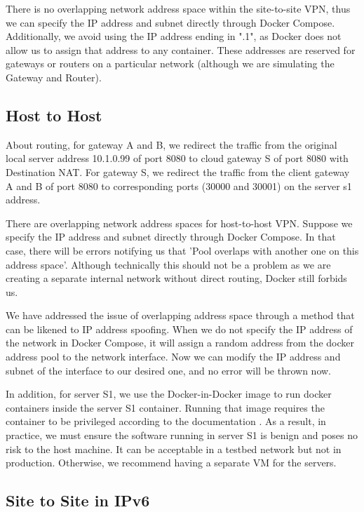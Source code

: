 \documentclass[article]{aaltoseries}
\begin{document}
There is no overlapping network address space within the site-to-site VPN, thus we can specify the IP address and subnet directly through Docker Compose. Additionally, we avoid using the IP address ending in ".1", as Docker does not allow us to assign that address to any container. These addresses are reserved for gateways or routers on a particular network (although we are simulating the Gateway and Router).

\subsection{Host to Host}

About routing, for gateway A and B, we redirect the traffic from the original local server address 10.1.0.99 of port 8080 to cloud gateway S of port 8080 with Destination NAT. For gateway S, we redirect the traffic from the client gateway A and B of port 8080 to corresponding ports (30000 and 30001) on the server s1 address.

There are overlapping network address spaces for host-to-host VPN. Suppose we specify the IP address and subnet directly through Docker Compose. In that case, there will be errors notifying us that 'Pool overlaps with another one on this address space'. Although technically this should not be a problem as we are creating a separate internal network without direct routing, Docker still forbids us.

We have addressed the issue of overlapping address space through a method that can be likened to IP address spoofing. When we do not specify the IP address of the network in Docker Compose, it will assign a random address from the docker address pool to the network interface. Now we can modify the IP address and subnet of the interface to our desired one, and no error will be thrown now.

In addition, for server S1, we use the Docker-in-Docker image to run docker containers inside the server S1 container. Running that image requires the container to be privileged according to the documentation \cite{Docker}. As a result, in practice, we must ensure the software running in server S1 is benign and poses no risk to the host machine. It can be acceptable in a testbed network but not in production. Otherwise, we recommend having a separate VM for the servers.

\subsection{Site to Site in IPv6}
\end{document}
